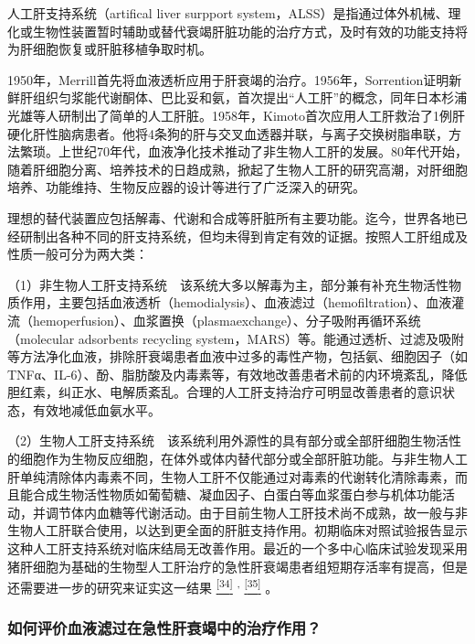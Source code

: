人工肝支持系统（artifical liver surpport
system，ALSS）是指通过体外机械、理化或生物性装置暂时辅助或替代衰竭肝脏功能的治疗方式，及时有效的功能支持将为肝细胞恢复或肝脏移植争取时机。

1950年，Merrill首先将血液透析应用于肝衰竭的治疗。1956年，Sorrention证明新鲜肝组织匀浆能代谢酮体、巴比妥和氨，首次提出“人工肝”的概念，同年日本杉浦光雄等人研制出了简单的人工肝脏。1958年，Kimoto首次应用人工肝救治了1例肝硬化肝性脑病患者。他将4条狗的肝与交叉血透器并联，与离子交换树脂串联，方法繁琐。上世纪70年代，血液净化技术推动了非生物人工肝的发展。80年代开始，随着肝细胞分离、培养技术的日趋成熟，掀起了生物人工肝的研究高潮，对肝细胞培养、功能维持、生物反应器的设计等进行了广泛深入的研究。

理想的替代装置应包括解毒、代谢和合成等肝脏所有主要功能。迄今，世界各地已经研制出各种不同的肝支持系统，但均未得到肯定有效的证据。按照人工肝组成及性质一般可分为两大类：

（1）非生物人工肝支持系统　该系统大多以解毒为主，部分兼有补充生物活性物质作用，主要包括血液透析（hemodialysis）、血液滤过（hemofiltration）、血液灌流（hemoperfusion）、血浆置换（plasmaexchange）、分子吸附再循环系统（molecular
adsorbents recycling
system，MARS）等。能通过透析、过滤及吸附等方法净化血液，排除肝衰竭患者血液中过多的毒性产物，包括氨、细胞因子（如TNFα、IL-6）、酚、脂肪酸及内毒素等，有效地改善患者术前的内环境紊乱，降低胆红素，纠正水、电解质紊乱。合理的人工肝支持治疗可明显改善患者的意识状态，有效地减低血氨水平。

（2）生物人工肝支持系统　该系统利用外源性的具有部分或全部肝细胞生物活性的细胞作为生物反应细胞，在体外或体内替代部分或全部肝脏功能。与非生物人工肝单纯清除体内毒素不同，生物人工肝不仅能通过对毒素的代谢转化清除毒素，而且能合成生物活性物质如葡萄糖、凝血因子、白蛋白等血浆蛋白参与机体功能活动，并调节体内血糖等代谢活动。由于目前生物人工肝技术尚不成熟，故一般与非生物人工肝联合使用，以达到更全面的肝脏支持作用。初期临床对照试验报告显示这种人工肝支持系统对临床结局无改善作用。最近的一个多中心临床试验发现采用猪肝细胞为基础的生物型人工肝治疗的急性肝衰竭患者组短期存活率有提高，但是还需要进一步的研究来证实这一结果
\protect\hyperlink{text00019.htmlux5cux23ch34-18}{\textsuperscript{{[}34{]}}}
\textsuperscript{,}
\protect\hyperlink{text00019.htmlux5cux23ch35-18}{\textsuperscript{{[}35{]}}}
。

\subsubsection{如何评价血液滤过在急性肝衰竭中的治疗作用？}

